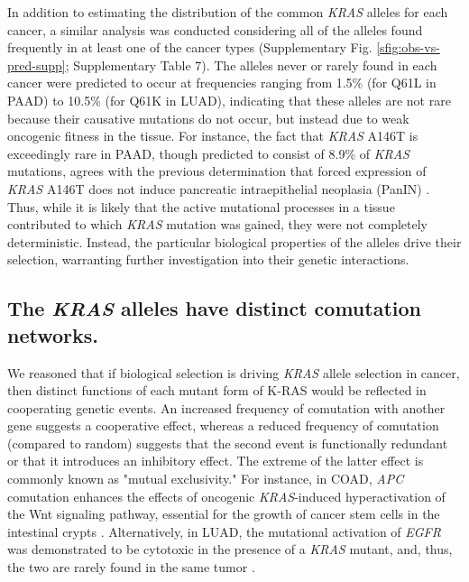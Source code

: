 \documentclass[english, 10pt, letterpaper]{article}
\newcommand{\KRAS}{\emph{KRAS}}
\newcommand{\kras}{K-RAS}
\begin{document}
In addition to estimating the distribution of the common \KRAS{} alleles for each cancer, a similar analysis was conducted considering all of the alleles found frequently in at least one of the cancer types (Supplementary Fig. \ref{sfig:obs-vs-pred-supp}; Supplementary Table 7).
The alleles never or rarely found in each cancer were predicted to occur at frequencies ranging from 1.5\% (for Q61L in PAAD) to 10.5\% (for Q61K in LUAD), indicating that these alleles are not rare because their causative mutations do not occur, but instead due to weak oncogenic fitness in the tissue.
For instance, the fact that \KRAS{} A146T is exceedingly rare in PAAD, though predicted to consist of 8.9\% of \KRAS{} mutations, agrees with the previous determination that forced expression of \KRAS{} A146T does not induce pancreatic intraepithelial neoplasia (PanIN) \cite{Poulin2019}.
Thus, while it is likely that the active mutational processes in a tissue contributed to which \KRAS{} mutation was gained, they were not completely deterministic.
Instead, the particular biological properties of the alleles drive their selection, warranting further investigation into their genetic interactions.


\subsection*{The \KRAS{} alleles have distinct comutation networks.}

We reasoned that if biological selection is driving \KRAS{} allele selection in cancer, then distinct functions of each mutant form of \kras{} would be reflected in cooperating genetic events. 
An increased frequency of comutation with another gene suggests a cooperative effect, whereas a reduced frequency of comutation (compared to random) suggests that the second event is functionally redundant or that it introduces an inhibitory effect.
The extreme of the latter effect is commonly known as "mutual exclusivity."
For instance, in COAD, \emph{APC} comutation enhances the effects of oncogenic \KRAS{}-induced hyperactivation of the Wnt signaling pathway, essential for the growth of cancer stem cells in the intestinal crypts \cite{Janssen2006, Fearon2014, Sakai2018, Jauhri2017}.
Alternatively, in LUAD, the mutational activation of \emph{EGFR} was demonstrated to be cytotoxic in the presence of a \KRAS{} mutant, and, thus, the two are rarely found in the same tumor \cite{Unni2015EvidenceAdenocarcinoma., Ambrogio2017InAdenocarcinoma.}.
\end{document}
